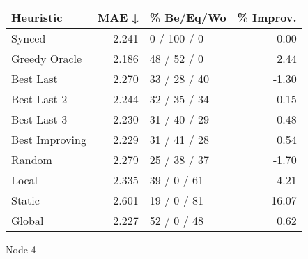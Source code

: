 \begin{tabular}{lrlr}
\toprule
\textbf{Heuristic} & \textbf{MAE ↓} & \textbf{\% Be/Eq/Wo} & \textbf{\% Improv.} \\
\midrule
            Synced &          2.241 &          0 / 100 / 0 &                0.00 \\
     Greedy Oracle &          2.186 &          48 / 52 / 0 &                2.44 \\
         Best Last &          2.270 &         33 / 28 / 40 &               -1.30 \\
       Best Last 2 &          2.244 &         32 / 35 / 34 &               -0.15 \\
       Best Last 3 &          2.230 &         31 / 40 / 29 &                0.48 \\
    Best Improving &          2.229 &         31 / 41 / 28 &                0.54 \\
            Random &          2.279 &         25 / 38 / 37 &               -1.70 \\
             Local &          2.335 &          39 / 0 / 61 &               -4.21 \\
            Static &          2.601 &          19 / 0 / 81 &              -16.07 \\
            Global &          2.227 &          52 / 0 / 48 &                0.62 \\
\bottomrule
\end{tabular}
\caption{Node 4}
\label{tab:hr_non_lr05_le2_bs4_4}
